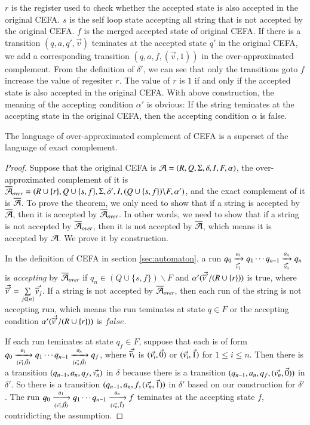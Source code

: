{$r$ is the register used to check whether the accepted state is also accepted in the original CEFA. $s$ is the self loop state accepting all string that is not accepted by the original CEFA. $f$ is the merged accepted state of original CEFA. If there is a transition $(q, a, q', \vec{v})$ teminates at the accepted state $q'$ in the original CEFA, we add a corresponding transition $(q, a, f, (\vec{v}, 1))$ in the over-approximated complement. From the definition of $\delta'$, we can see that only the transitions goto $f$ increase the value of regesiter $r$. The value of $r$ is $1$ if and only if the accepted state is also accepted in the original CEFA. With above construction, the meaning of the accepting condition $\alpha'$ is obvious: If the string teminates at the accepting state in the original CEFA, then the accepting condition $\alpha$ is false.

\begin{theorem}
  The language of over-approximated complement of CEFA is a superset of the language of exact complement.
\end{theorem}
\begin{proof}
   Suppose that the original CEFA is $\mathcal{A} = (R, Q, \Sigma, \delta, I, F, \alpha)$, the over-approximated complement of it is $\overline{\mathcal{A}}_{over} = (R\cup\{r\}, Q\cup\{s,f\}, \Sigma, \delta', I, (Q\cup\{s,f\})\backslash F, \alpha')$, and the exact complement of it is $\overline{\mathcal{A}}$. To prove the theorem, we only need to show that if a string is accepted by $\overline{\mathcal{A}}$, then it is accepted by $\overline{\mathcal{A}}_{over}$. In other words, we need to show that if a string is not accepted by $\overline{\mathcal{A}}_{over}$, then it is not accepted by $\overline{\mathcal{A}}$, which means it is accepted by $\mathcal{A}$. We prove it by construction.
   
   In the definition of CEFA in section \ref{sec:automaton}, a run $q_0 \xrightarrow[\vec{\overline{v}_1}]{a_1} q_1 \cdots q_{n-1}\xrightarrow[\vec{\overline{v}_n}]{a_n} q_n$ is \emph{accepting} by $\overline{\mathcal{A}}_{over}$ if $q_n \in (Q\cup\{s,f\})\backslash F$ and $\alpha'(\vec{\overline{v}'}/(R\cup\{r\}))$ is true, where $\vec{\overline{v}'} = \sum \limits_{j \in [n]} \vec{\overline{v}_j}$. If a string is not accepted by $\overline{\mathcal{A}}_{over}$, then each run of the string is not accepting run, which means the run teminates at state $q\in F$ or the accepting condition $\alpha'(\vec{\overline{v}'}/(R\cup\{r\}))$ is $false$. 
   
   If each run teminates at state $q_f\in F$, suppose that each is of form $q_0\xrightarrow[(\vec{v_1},\vec{0})]{a_1}q_1\cdots q_{n-1}\xrightarrow[(\vec{v_n},\vec{0})]{a_n}q_f$, where $\vec{\overline{v}_i}$ is $(\vec{v_i}, \vec{0})$ or $(\vec{v_i}, \vec{1})$ for $1\leq i\leq n$. Then there is a transition $(q_{n-1}, a_n, q_f, \vec{v_n})$ in $\delta$ because there is a transition $(q_{n-1}, a_n, q_f, (\vec{v_n}, \vec{0}))$ in $\delta'$. So there is a transition $(q_{n-1}, a_n, f, (\vec{v_n}, \vec{1}))$ in $\delta'$ based on our construction for $\delta'$. The run $q_0\xrightarrow[(\vec{v_1},\vec{0})]{a_1}q_1\cdots q_{n-1}\xrightarrow[(\vec{v_n},\vec{1})]{a_n}f$ teminates at the accepting state $f$, contridicting the assumption. 
   

\end{proof}}

